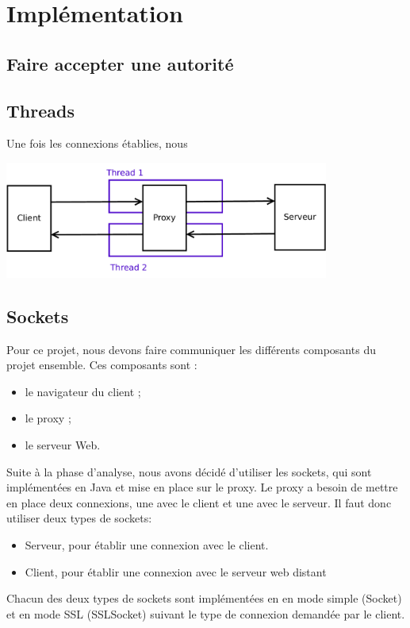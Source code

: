 \documentclass[a4paper,11pt,french]{report}
\begin{document}
\section{Implémentation}
\subsection{Faire accepter une autorité}


\subsection{Threads}

Une fois les connexions établies, nous 

\includegraphics[width=0.8\textwidth]{images/thread.pdf}

\subsection{Sockets}
Pour ce projet, nous devons faire communiquer les différents composants du projet ensemble. Ces composants sont :
\begin{itemize}
\item le navigateur du client ;
\item le proxy ;
\item le serveur Web.
\end{itemize}

Suite à la phase d'analyse, nous avons décidé d'utiliser les sockets, qui sont implémentées en Java 
et mise en place sur le proxy. Le proxy a besoin de mettre en place deux 
connexions, une avec le client et une avec le serveur. Il faut donc utiliser 
deux types de sockets:
\begin{itemize}
  \item Serveur, pour établir une connexion avec le client.
  \item Client, pour établir une connexion avec le serveur web distant
\end{itemize}
Chacun des deux types de sockets sont implémentées en en mode simple (Socket) et 
en mode SSL (SSLSocket) suivant le type de connexion demandée par le client.
\end{document}
